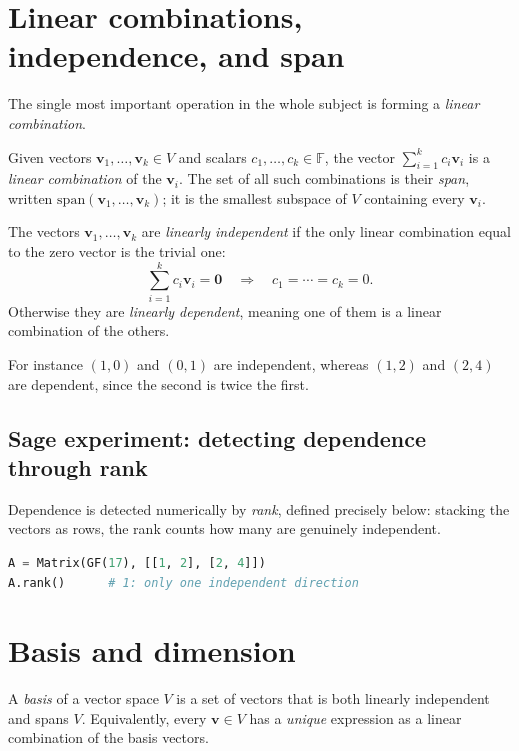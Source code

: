 \section{Linear combinations, independence, and span}
The single most important operation in the whole subject is forming a \emph{linear combination}.

\begin{definition}
Given vectors $\mathbf{v}_1,\dots,\mathbf{v}_k \in V$ and scalars $c_1,\dots,c_k\in\mathbb{F}$, the vector $\sum_{i=1}^k c_i\mathbf{v}_i$ is a \emph{linear combination} of the $\mathbf{v}_i$. The set of all such combinations is their \emph{span}, written $\mathrm{span}(\mathbf{v}_1,\dots,\mathbf{v}_k)$; it is the smallest subspace of $V$ containing every $\mathbf{v}_i$.
\end{definition}

\begin{definition}
The vectors $\mathbf{v}_1,\dots,\mathbf{v}_k$ are \emph{linearly independent} if the only linear combination equal to the zero vector is the trivial one:
\[
\sum_{i=1}^k c_i \mathbf{v}_i = \mathbf{0} \quad\Longrightarrow\quad c_1 = \cdots = c_k = 0.
\]
Otherwise they are \emph{linearly dependent}, meaning one of them is a linear combination of the others.
\end{definition}

For instance $(1,0)$ and $(0,1)$ are independent, whereas $(1,2)$ and $(2,4)$ are dependent, since the second is twice the first.

\subsection{Sage experiment: detecting dependence through rank}
Dependence is detected numerically by \emph{rank}, defined precisely below: stacking the vectors as rows, the rank counts how many are genuinely independent.

\begin{lstlisting}[language=Python]
A = Matrix(GF(17), [[1, 2], [2, 4]])
A.rank()      # 1: only one independent direction
\end{lstlisting}

\section{Basis and dimension}
\begin{definition}[Basis]
A \emph{basis} of a vector space $V$ is a set of vectors that is both linearly independent and spans $V$. Equivalently, every $\mathbf{v}\in V$ has a \emph{unique} expression as a linear combination of the basis vectors.
\end{definition}

